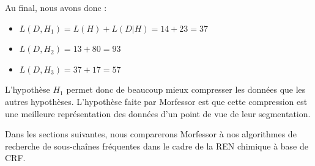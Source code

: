 \documentclass[PhD-Yoann-Dupont.tex]{subfiles}
\begin{document}
Au final, nous avons donc :

\begin{itemize}
    \item $L(D,H_{1}) = L(H) + L(D|H) = 14 + 23 = 37$
    \item $L(D,H_{2}) = 13 + 80 = 93$
    \item $L(D,H_{3}) = 37 + 17 = 57$
\end{itemize}

L'hypothèse $H_{1}$ permet donc de beaucoup mieux compresser les données que les autres hypothèses. L'hypothèse faite par Morfessor est que cette compression est une meilleure représentation des données d'un point de vue de leur segmentation.

Dans les sections suivantes, nous comparerons Morfessor à nos algorithmes de recherche de sous-chaînes fréquentes dans le cadre de la REN chimique à base de CRF.
\end{document}
